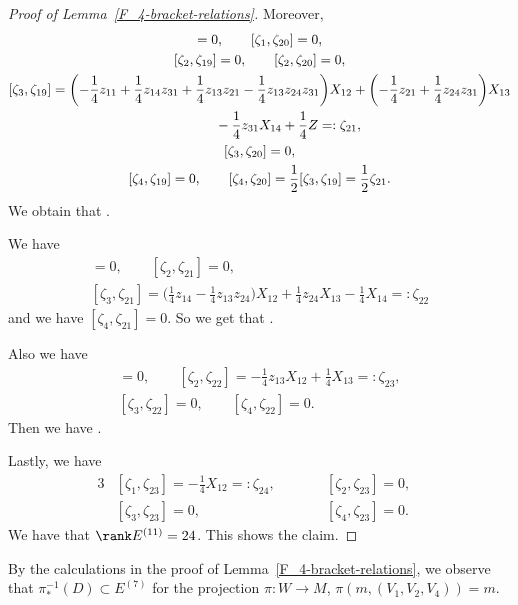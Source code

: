 \begin{proof}[Proof of Lemma~\ref{F_4-bracket-relations}]
Moreover,
\begin{gather*}
[\zeta_1, \zeta_{19}] = 0, \qquad [\zeta_1, \zeta_{20}] = 0, \\
[\zeta_2, \zeta_{19}] = 0, \qquad [\zeta_2, \zeta_{20}] = 0, \\
[\zeta_3, \zeta_{19}] = \biggl(-\frac{1}{4}z_{11} + \frac{1}{4}z_{14}z_{31} + \frac{1}{4}z_{13}z_{21} - \frac{1}{4}z_{13}z_{24}z_{31}\biggr)X_{12} +
\biggl(-\frac{1}{4}z_{21} + \frac{1}{4}z_{24}z_{31}\biggr)X_{13}
\\
\hphantom{[\zeta_3, \zeta_{19}] =}{}
 - \frac{1}{4}z_{31}X_{14} + \frac{1}{4}Z =: \zeta_{21},
\\
[\zeta_3, \zeta_{20}] = 0, \\
[\zeta_4, \zeta_{19}] = 0, \qquad [\zeta_4, \zeta_{20}] = \frac{1}{2}[\zeta_3, \zeta_{19}]
= \frac{1}{2}\zeta_{21}.
\end{gather*}
We obtain that .

We have
\begin{gather*}
[\zeta_1, \zeta_{21}] = 0, \qquad
[\zeta_2, \zeta_{21}] = 0, \\
[\zeta_3, \zeta_{21}] =
\biggl(\frac{1}{4}z_{14} - \frac{1}{4}z_{13}z_{24}\biggr)X_{12} + \frac{1}{4}z_{24}X_{13} - \frac{1}{4}X_{14} =: \zeta_{22}
\end{gather*}
and we have $[\zeta_4, \zeta_{21}] = 0$.
So we get that .

Also we have
\begin{gather*}
[\zeta_1, \zeta_{22}] = 0, \qquad [\zeta_2, \zeta_{22}] = -\frac{1}{4}z_{13}X_{12} + \frac{1}{4}X_{13} =: \zeta_{23}, \\
 [\zeta_3, \zeta_{22}] = 0, \qquad [\zeta_4, \zeta_{22}] = 0.
\end{gather*}
Then we have .

Lastly, we have
\begin{alignat*}{3}
&[\zeta_1, \zeta_{23}] = - \frac{1}{4}X_{12} =: \zeta_{24}, \qquad &&[\zeta_2, \zeta_{23}] = 0,& \\
&[\zeta_3, \zeta_{23}] = 0, \qquad&& [\zeta_4, \zeta_{23}] = 0.&
\end{alignat*}
We have that $\rank E^{(11)} = 24$.
This shows the claim.
\end{proof}


\begin{Remark}
By the calculations in the proof of Lemma~\ref{F_4-bracket-relations}, we observe that
$\pi_*^{-1}(D) \subset E^{(7)}$ for the projection $\pi\colon W \to M$, $\pi(m, (V_1, V_2, V_4)) = m$.
\end{Remark}


